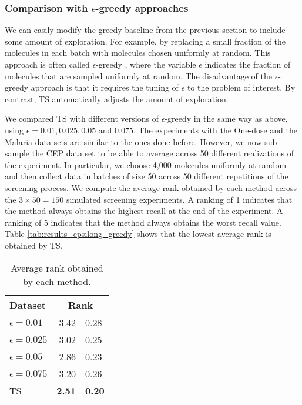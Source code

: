 \subsubsection{Comparison with $\epsilon$-greedy approaches}

We can easily modify the greedy baseline from the previous section to include some amount of exploration. For example, by replacing a small fraction of the molecules in each batch with molecules chosen uniformly at random. This approach is often called $\epsilon$-greedy \cite{watkins1989learning}, where the variable $\epsilon$ indicates the fraction of molecules that are sampled uniformly at random. The disadvantage of the $\epsilon$-greedy approach is that it requires the tuning of $\epsilon$ to the problem of interest. By contrast, TS automatically adjusts the amount of exploration. 

We compared TS with different versions of $\epsilon$-greedy in the same way as above, using $\epsilon = 0.01, 0.025, 0.05$ and $0.075$. The experiments with the One-dose and the Malaria data sets are similar to the ones done before. However, we now sub-sample the CEP data set to be able to average across 50 different realizations of the experiment. In particular, we choose 4,000 molecules uniformly at random and then collect data in batches of size 50 across 50 different repetitions of the screening process. We compute the average rank obtained by each method across the $3\times 50 = 150$ simulated screening experiments. A ranking of 1 indicates that the method always obtains the highest recall at the end of the experiment. A ranking of 5 indicates that the method always obtains the worst recall value. Table \ref{tab:results_epsilong_greedy} shows that the lowest average rank is obtained by TS.

\begin{table}
\centering
\caption{Average rank obtained by each method.}\label{tab:results_epsilon_greedy}
\begin{tabular}{lr@{$\pm$}l}
\hline
\bf{Dataset}& \multicolumn{2}{c}{\bf{Rank}}\\
\hline
$\epsilon = 0.01$ & 3.42 & 0.28 \\
$\epsilon = 0.025$ & 3.02 & 0.25 \\
$\epsilon = 0.05$ & 2.86 & 0.23 \\
$\epsilon = 0.075$ & 3.20 & 0.26 \\
TS & \bf{ 2.51 }&\bf{ 0.20 } \\
\hline
\end{tabular}
\end{table}